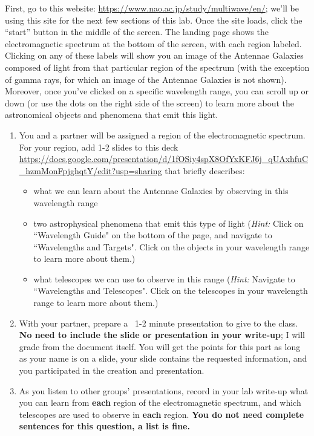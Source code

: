 \documentclass[11pt]{article}
\begin{document}
\medskip \noindent
First, go to this website: \url{https://www.nao.ac.jp/study/multiwave/en/}; we'll be using this site for the next few sections of this lab. Once the site loads, click the ``start'' button in the middle of the screen. The landing page shows the electromagnetic spectrum at the bottom of the screen, with each region labeled. Clicking on any of these labels will show you an image of the Antennae Galaxies composed of light from that particular region of the spectrum (with the exception of gamma rays, for which an image of the Antennae Galaxies is not shown). Moreover, once you've clicked on a specific wavelength range, you can scroll up or down (or use the dots on the right side of the screen) to learn more about the astronomical objects and phenomena that emit this light.

\begin{enumerate}
    \item You and a partner will be assigned a region of the electromagnetic spectrum.  For your region, add 1-2 slides to this deck \url{https://docs.google.com/presentation/d/1fOSiy4spX8OfYxKFJ6j_qUAxhfuC_hzmMonFpjghqtY/edit?usp=sharing} that briefly describes:
    \begin{itemize}
        \item what we can learn about the Antennae Galaxies by observing in this wavelength range
        \item two astrophysical phenomena that emit this type of light (\textit{Hint: }Click on ``Wavelength Guide" on the bottom of the page, and navigate to ``Wavelengths and Targets". Click on the objects in your wavelength range to learn more about them.)
        \item what telescopes we can use to observe in this range (\textit{Hint: }Navigate to ``Wavelengths and Telescopes". Click on the telescopes in your wavelength range to learn more about them.)
    \end{itemize} 
    \item With your partner, prepare a ~1-2 minute presentation to give to the class. \textbf{No need to include the slide or presentation in your write-up}; I will grade from the document itself. You will get the points for this part as long as your name is on a slide, your slide contains the requested information, and you participated in the creation and presentation.
    \item As you listen to other groups' presentations, record in your lab write-up what you can learn from \textbf{each} region of the electromagnetic spectrum, and which telescopes are used to observe in \textbf{each} region. \textbf{You do not need complete sentences for this question, a list is fine.}
\end{enumerate}
\end{document}
